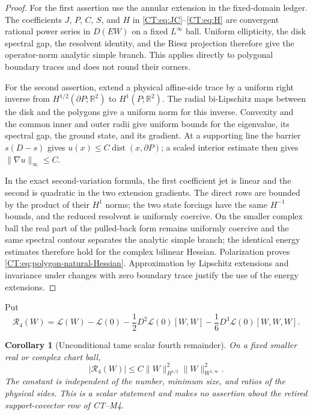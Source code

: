 \documentclass[11pt]{amsart}
\numberwithin{equation}{section}
\newtheorem{corollary}[theorem]{Corollary}
\theoremstyle{definition}
\theoremstyle{remark}
\begin{document}
\begin{proof}
For the first assertion use the annular extension in the fixed-domain
ledger.  The coefficients $J$, $P$, $C$, $S$, and $H$ in
\eqref{CT:eq:JC}--\eqref{CT:eq:H} are convergent rational power series in
$D(EW)$ on a fixed $L^\infty$ ball.  Uniform ellipticity, the disk spectral
gap, the resolvent identity, and the Riesz projection therefore give the
operator-norm analytic simple branch.  This applies directly to polygonal
boundary traces and does not round their corners.

For the second assertion, extend a physical affine-side trace by a uniform
right inverse from $H^{1/2}(\partial P;\mathbb R^2)$ to
$H^1(P;\mathbb R^2)$.  The radial bi-Lipschitz maps between the disk and
the polygons give a uniform norm for this inverse.  Convexity and the
common inner and outer radii give uniform bounds for the eigenvalue, its
spectral gap, the ground state, and its gradient.  At a supporting line
the barrier $s(D-s)$ gives
$u(x)\le C\operatorname {dist}(x,\partial P)$; a scaled interior estimate
then gives $\|\nabla u\|_\infty\le C$.

In the exact second-variation formula, the first coefficient jet is linear
and the second is quadratic in the two extension gradients.  The direct
rows are bounded by the product of their $H^1$ norms; the two state
forcings have the same $H^{-1}$ bounds, and the reduced resolvent is
uniformly coercive.  On the smaller complex ball the real part of the
pulled-back form remains uniformly coercive and the same spectral contour
separates the analytic simple branch; the identical energy estimates
therefore hold for the complex bilinear Hessian.  Polarization proves
\eqref{CT:eq:polygon-natural-Hessian}.  Approximation by Lipschitz extensions
and invariance under changes with zero boundary trace justify the use of
the energy extensions.
\end{proof}

Put
\begin{equation}\label{CT:eq:R4-definition}
 \mathcal R_4(W)=\mathcal L(W)-\mathcal L(0)
 -\frac12D^2\mathcal L(0)[W,W]
 -\frac16D^3\mathcal L(0)[W,W,W].
\end{equation}

\begin{corollary}[Unconditional tame scalar fourth remainder]
\label{CT:cor:tame-scalar-fourth}
On a fixed smaller real or complex chart ball,
\begin{equation}\label{CT:eq:tame-scalar-fourth}
 \boxed{
 |\mathcal R_4(W)|
 \le C\|W\|_{H^{1/2}}^2\|W\|_{W^{1,\infty}}^2.}
\end{equation}
The constant is independent of the number, minimum size, and ratios of the
physical sides.  This is a scalar statement and makes no assertion about
the retired support-covector row of CT--M4.
\end{corollary}
\end{document}
